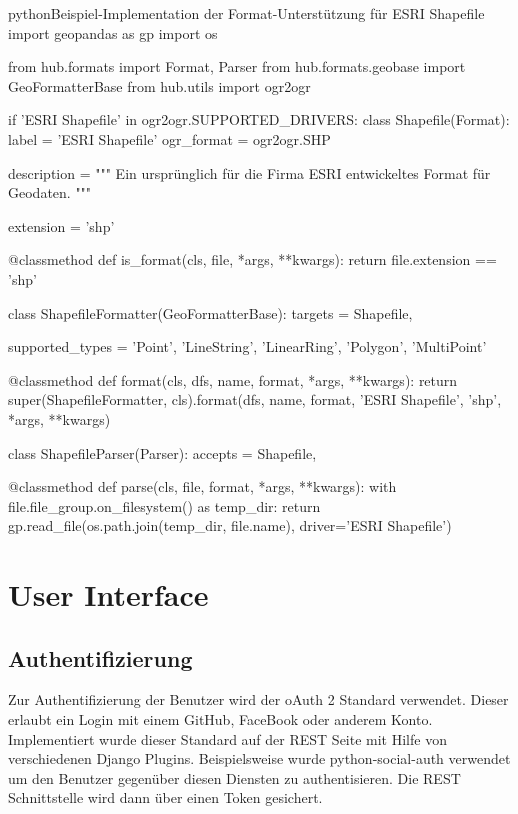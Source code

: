 \begin{srclst}[label=src:pd:format-example]{python}{Beispiel-Implementation der Format-Unterstützung für ESRI Shapefile}
import geopandas as gp
import os

from hub.formats import Format, Parser
from hub.formats.geobase import GeoFormatterBase
from hub.utils import ogr2ogr

if 'ESRI Shapefile' in ogr2ogr.SUPPORTED_DRIVERS:
    class Shapefile(Format):
        label = 'ESRI Shapefile'
        ogr_format = ogr2ogr.SHP

        description = """
        Ein ursprünglich für die Firma ESRI entwickeltes Format für Geodaten.
        """

        extension = 'shp'

        @classmethod
        def is_format(cls, file, *args, **kwargs):
            return file.extension == 'shp'

    class ShapefileFormatter(GeoFormatterBase):
        targets = Shapefile,

        supported_types = {'Point', 'LineString', 'LinearRing', 'Polygon', 'MultiPoint'}

        @classmethod
        def format(cls, dfs, name, format, *args, **kwargs):
            return super(ShapefileFormatter, cls).format(dfs, name, format, 'ESRI Shapefile', 'shp', *args, **kwargs)

    class ShapefileParser(Parser):
        accepts = Shapefile,

        @classmethod
        def parse(cls, file, format, *args, **kwargs):
            with file.file_group.on_filesystem() as temp_dir:
                return gp.read_file(os.path.join(temp_dir, file.name), driver='ESRI Shapefile')
\end{srclst}

\section{User Interface}
\subsection{Authentifizierung}
Zur Authentifizierung der Benutzer wird der oAuth 2 Standard verwendet. Dieser erlaubt ein Login mit einem GitHub, FaceBook oder anderem Konto. Implementiert wurde dieser Standard auf der REST Seite mit Hilfe von verschiedenen Django Plugins. 
Beispielsweise wurde python-social-auth verwendet um den Benutzer gegenüber diesen Diensten zu authentisieren. Die REST Schnittstelle wird dann über einen Token gesichert.

